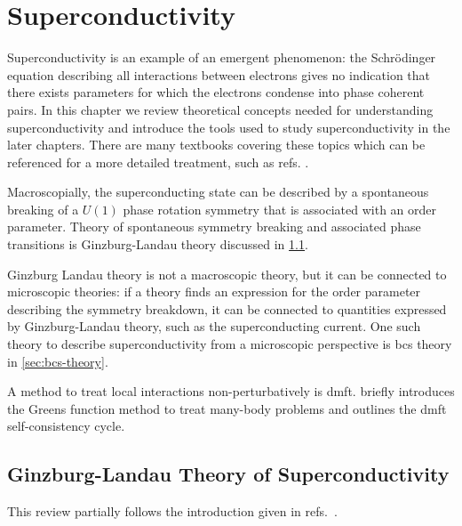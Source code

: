 \documentclass[../notes.tex]{subfiles}
\begin{document}
\chapter{Superconductivity}\label{ch:superconductivity}

Superconductivity is an example of an emergent phenomenon: the Schrödinger equation describing all interactions between electrons gives no indication that there exists parameters for which the electrons condense into phase coherent pairs.
In this chapter we review theoretical concepts needed for understanding superconductivity and introduce the tools used to study superconductivity in the later chapters.
There are many textbooks covering these topics which can be referenced for a more detailed treatment, such as refs. \cite{colemanIntroductionManyBodyPhysics2015, tinkhamIntroductionSuperconductivity1996, bruusManyBodyQuantumTheory2004, larkinTheoryFluctuationsSuperconductors2005, bennemannSuperconductivity2008}.

Macroscopially, the superconducting state can be described by a spontaneous breaking of a \(U(1)\) phase rotation symmetry that is associated with an order parameter.
Theory of spontaneous symmetry breaking and associated phase transitions is Ginzburg-Landau theory discussed in \cref{sec:Ginzburg-Landau theory of superconductivity}.

Ginzburg Landau theory is not a macroscopic theory, but it can be connected to microscopic theories: if a theory finds an expression for the order parameter describing the symmetry breakdown, it can be connected to quantities expressed by Ginzburg-Landau theory, such as the superconducting current.
One such theory to describe superconductivity from a microscopic perspective is \acrfull{bcs} theory in \cref{sec:bcs-theory}.

A method to treat local interactions non-perturbatively is \acrfull{dmft}.  briefly introduces the Greens function method to treat many-body problems and outlines the \acrshort{dmft} self-consistency cycle.

\section{Ginzburg-Landau Theory of Superconductivity}\label{sec:Ginzburg-Landau theory of superconductivity}

This review partially follows the introduction given in refs.~\cite{colemanIntroductionManyBodyPhysics2015, beekmanIntroductionSpontaneousSymmetry2019}.
\end{document}

